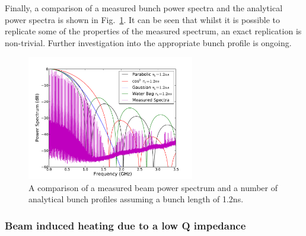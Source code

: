 Finally, a comparison of a measured bunch power spectra and the analytical power spectra is shown in Fig.~\ref{fig:power_all}. It can be seen that whilst it is possible to replicate some of the properties of the measured spectrum, an exact replication is non-trivial. Further investigation into the appropriate bunch profile is ongoing.

\begin{figure}
\begin{center}
\includegraphics[width=0.65\textwidth]{Wakefields_and_Impedances/figures/beam_spectra_power_12ns.pdf}
\end{center}
\label{fig:power_all}
\caption{A comparison of a measured beam power spectrum and a number of analytical bunch profiles assuming a bunch length of 1.2ns.}
\end{figure}




\subsubsection{Beam induced heating due to a low Q impedance}

